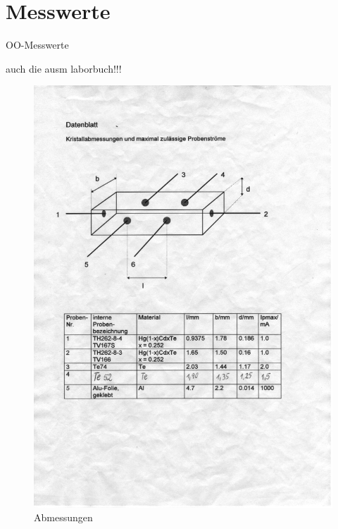 \newpage

\onecolumn

\appendix

\section{Messwerte}
\label{sec:messwerte}
OO-Messwerte

auch die ausm laborbuch!!!

\begin{figure}[htb!]
 \centering
 \includegraphics[viewport=40 420 470 700,clip]{../docs/scan_datenblatt}
 \caption{Abmessungen}
 \label{fig:abmessungen}
\end{figure}



